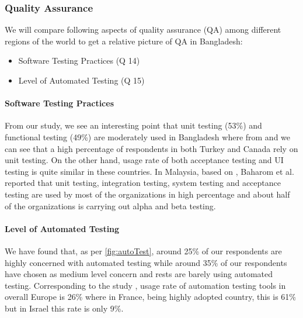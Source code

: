 \subsubsection{Quality Assurance}
\label{quality_assurance_comparison}

We will compare following aspects of quality assurance (QA) among different regions of the world to get a relative picture of QA in Bangladesh:

\begin{itemize}
    \item Software Testing Practices (Q 14)
    \item Level of Automated Testing (Q 15)
\end{itemize}


\paragraph{Software Testing Practices}
From our study, we see an interesting point that unit testing (53\%) and functional testing (49\%) are moderately used in Bangladesh where from \cite{Wang2018} and \cite{Garousi2013} we can see that a high percentage of respondents in both Turkey and Canada rely on unit testing. On the other hand, usage rate of both acceptance testing and UI testing is quite similar in these countries. In Malaysia, based on \cite{Baharom2006}, Baharom et al. reported that unit testing, integration testing, system testing and acceptance testing are used by most of the organizations in high percentage and about half of the organizations is carrying out alpha and beta testing.



\paragraph{Level of Automated Testing}
We have found that, as per \ref{fig:autoTest}, around 25\% of our respondents are highly concerned with automated testing while around 35\% of our respondents have chosen as medium level concern and rests are barely using automated testing. Corresponding to the study \cite{dutta1999}, usage rate of automation testing tools in overall Europe is 26\% where in France, being highly adopted country, this is 61\% but in Israel this rate is only 9\%.
